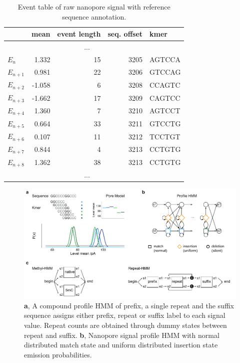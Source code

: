 \begin{table}[ht]
	\centering
	\caption[Event detection and annotation]{Event table of raw nanopore signal with reference sequence annotation.}
	\label{tab:signal:events}
	\begin{tabular}{l|r|r|r|l}
		 & mean & event length & seq. offset & kmer \\
		\hline 
		& \multicolumn{3}{c|}{...} &  \\
		\hline
		$ E_{n} $ &  1.332  & 15 & 3205 & AGTCCA \\
		\rowcolor{LightOrange}
		$ E_{n+1} $ &  0.981  & 22 & 3206 & GTCCAG \\
		$ E_{n+2} $ & -1.058  &  6 & 3208 & CCAGTC \\
		$ E_{n+3} $ & -1.662  & 17 & 3209 & CAGTCC \\
		$ E_{n+4} $ &  1.360  &  7 & 3210 & AGTCCT \\
		$ E_{n+5} $ &  0.664  & 33 & 3211 & GTCCTG \\
		$ E_{n+6} $ &  0.107  & 11 & 3212 & TCCTGT \\
		\rowcolor{LightGreen}
		$ E_{n+7} $ &  0.844  &  4 & 3213 & CCTGTG \\
		\rowcolor{LightGreen}
		$ E_{n+8} $ &  1.362  & 38 & 3213 & CCTGTG \\
		\hline
		& \multicolumn{3}{c|}{...} &  \\
	\end{tabular} 
\end{table}


\cite{Schreiber2015}

\begin{figure}[h]
	\centering
	\includegraphics[width=1.0\textwidth]{figures/signal/count_hmm.pdf}
	\captionsetup{format=plain}
	\caption[Nanopore signal alignment with HMMs]{\textbf{a}, A compound profile HMM of prefix, a single repeat and the suffix sequence assigns either prefix, repeat or suffix label to each signal value. Repeat counts are obtained through dummy states between repeat and suffix. \textbf{b}, Nanopore signal profile HMM with normal distributed match state and uniform distributed insertion state emission probabilities.}
	\label{fig:strique:count_hmm}
\end{figure}


